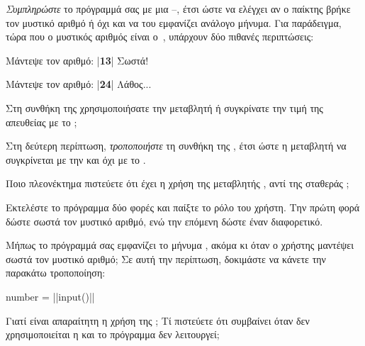 \documentclass[a4paper,11pt,oneside]{book}
\begin{document}
\begin{step}
\emph{Συμπληρώστε} το πρόγραμμά σας με μια --, έτσι ώστε να ελέγχει αν ο παίκτης βρήκε τον μυστικό αριθμό ή όχι και να του εμφανίζει ανάλογο μήνυμα. Για παράδειγμα, τώρα που ο μυστικός αριθμός είναι ο~, υπάρχουν δύο πιθανές περιπτώσεις:

\marginnote[24pt]{\iconcomputer\hspace{1ex}\iconkeyboard}
\begin{pyterm}
Μάντεψε τον αριθμό:
|\textbf{13}|
Σωστά!
\end{pyterm}

\begin{pyterm}
Μάντεψε τον αριθμό:
|\textbf{24}|
Λάθος...
\end{pyterm}

Στη συνθήκη της  χρησιμοποιήσατε την μεταβλητή  ή συγκρίνατε την τιμή της  απευθείας με το ;

\marginnote[14pt]{\icondiscuss}
\dottedline

Στη δεύτερη περίπτωση, \emph{τροποποιήστε} τη συνθήκη της , έτσι ώστε η μεταβλητή  να συγκρίνεται με την  και όχι με το .

Ποιο πλεονέκτημα πιστεύετε ότι έχει η χρήση της μεταβλητής , αντί της σταθεράς ;

\marginnote[14pt]{\icondiscuss}
\dottedline

\dottedline
\end{step}

\begin{step}
Εκτελέστε το πρόγραμμα δύο φορές και παίξτε το ρόλο του χρήστη. Την πρώτη φορά δώστε σωστά τον μυστικό αριθμό, ενώ την επόμενη δώστε έναν διαφορετικό. 

Μήπως το πρόγραμμά σας εμφανίζει το μήνυμα , ακόμα κι όταν ο χρήστης μαντέψει σωστά τον μυστικό αριθμό; Σε αυτή την περίπτωση, δοκιμάστε να κάνετε την παρακάτω τροποποίηση:

\marginnote[14pt]{\iconcaution}
\begin{pyplain}
number = ||input()|\pyhighlight{)}|
\end{pyplain}

Γιατί είναι απαραίτητη η χρήση της ; Τί πιστεύετε ότι συμβαίνει όταν δεν χρησιμοποιείται η  και το πρόγραμμα δεν λειτουργεί;

\marginnote[14pt]{\icondiscuss}
\dottedline

\dottedline
\end{step}
\end{document}
